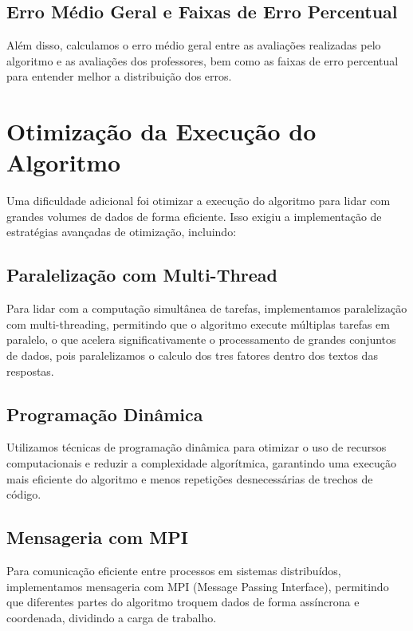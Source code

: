 \subsection{Erro Médio Geral e Faixas de Erro Percentual}

Além disso, calculamos o erro médio geral entre as avaliações realizadas pelo algoritmo e as avaliações dos professores, bem como as faixas de erro percentual para entender melhor a distribuição dos erros.

\section{Otimização da Execução do Algoritmo}

Uma dificuldade adicional foi otimizar a execução do algoritmo para lidar com grandes volumes de dados de forma eficiente. Isso exigiu a implementação de estratégias avançadas de otimização, incluindo:

\subsection{Paralelização com Multi-Thread}

Para lidar com a computação simultânea de tarefas, implementamos paralelização com multi-threading, permitindo que o algoritmo execute múltiplas tarefas em paralelo, o que acelera significativamente o processamento de grandes conjuntos de dados, pois paralelizamos o calculo dos tres fatores dentro dos textos das respostas.

\subsection{Programação Dinâmica}

Utilizamos técnicas de programação dinâmica para otimizar o uso de recursos computacionais e reduzir a complexidade algorítmica, garantindo uma execução mais eficiente do algoritmo e menos repetições desnecessárias de trechos de código.

\subsection{Mensageria com MPI}

Para comunicação eficiente entre processos em sistemas distribuídos, implementamos mensageria com MPI (Message Passing Interface), permitindo que diferentes partes do algoritmo troquem dados de forma assíncrona e coordenada, dividindo a carga de trabalho.

